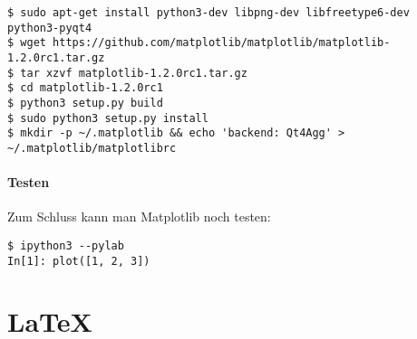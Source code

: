\begin{verbatim}
$ sudo apt-get install python3-dev libpng-dev libfreetype6-dev python3-pyqt4
$ wget https://github.com/matplotlib/matplotlib/matplotlib-1.2.0rc1.tar.gz
$ tar xzvf matplotlib-1.2.0rc1.tar.gz
$ cd matplotlib-1.2.0rc1
$ python3 setup.py build
$ sudo python3 setup.py install
$ mkdir -p ~/.matplotlib && echo 'backend: Qt4Agg' > ~/.matplotlib/matplotlibrc
\end{verbatim}

\subsubsection{Testen}

Zum Schluss kann man Matplotlib noch testen:

\begin{verbatim}
$ ipython3 --pylab
In[1]: plot([1, 2, 3])
\end{verbatim}





\chapter{LaTeX}

